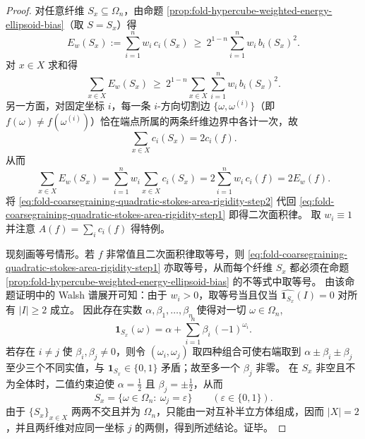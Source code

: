 \begin{proof}
对任意纤维 \(S_x\subseteq\Omega_n\)，由命题 \ref{prop:fold-hypercube-weighted-energy-ellipsoid-bias}（取 \(S=S_x\)）得
\[
E_w(S_x):=\sum_{i=1}^n w_i\,c_i(S_x)\ \ge\ 2^{1-n}\sum_{i=1}^n w_i\,b_i(S_x)^2.
\]
对 \(x\in X\) 求和得
\begin{equation}\label{eq:fold-coarsegraining-quadratic-stokes-area-rigidity-step1}
\sum_{x\in X}E_w(S_x)\ \ge\ 2^{1-n}\sum_{x\in X}\sum_{i=1}^n w_i\,b_i(S_x)^2.
\end{equation}
另一方面，对固定坐标 \(i\)，每一条 \(i\)-方向切割边 \(\{\omega,\omega^{(i)}\}\)（即 \(f(\omega)\neq f(\omega^{(i)})\)）恰在端点所属的两条纤维边界中各计一次，故
\[
\sum_{x\in X}c_i(S_x)=2c_i(f).
\]
从而
\begin{equation}\label{eq:fold-coarsegraining-quadratic-stokes-area-rigidity-step2}
\sum_{x\in X}E_w(S_x)
=\sum_{i=1}^n w_i\sum_{x\in X}c_i(S_x)
=2\sum_{i=1}^n w_i\,c_i(f)
=2E_w(f).
\end{equation}
将 \eqref{eq:fold-coarsegraining-quadratic-stokes-area-rigidity-step2} 代回 \eqref{eq:fold-coarsegraining-quadratic-stokes-area-rigidity-step1} 即得二次面积律。
取 \(w_i\equiv 1\) 并注意 \(A(f)=\sum_i c_i(f)\) 得特例。
\par
现刻画等号情形。若 \(f\) 非常值且二次面积律取等号，则 \eqref{eq:fold-coarsegraining-quadratic-stokes-area-rigidity-step1} 亦取等号，从而每个纤维 \(S_x\) 都必须在命题 \ref{prop:fold-hypercube-weighted-energy-ellipsoid-bias} 的不等式中取等号。
由该命题证明中的 Walsh 谱展开可知：由于 \(w_i>0\)，取等号当且仅当 \(\widehat{\mathbf 1_{S_x}}(I)=0\) 对所有 \(|I|\ge 2\) 成立。
因此存在实数 \(\alpha,\beta_1,\dots,\beta_n\) 使得对一切 \(\omega\in\Omega_n\),
\[
\mathbf 1_{S_x}(\omega)=\alpha+\sum_{i=1}^n \beta_i\,(-1)^{\omega_i}.
\]
若存在 \(i\neq j\) 使 \(\beta_i,\beta_j\neq 0\)，则令 \((\omega_i,\omega_j)\) 取四种组合可使右端取到 \(\alpha\pm\beta_i\pm\beta_j\) 至少三个不同实值，与 \(\mathbf 1_{S_x}\in\{0,1\}\) 矛盾；故至多一个 \(\beta_j\) 非零。
在 \(S_x\) 非空且不为全体时，二值约束迫使 \(\alpha=\tfrac12\) 且 \(\beta_j=\pm\tfrac12\)，从而
\[
S_x=\{\omega\in\Omega_n:\ \omega_j=\varepsilon\}\qquad(\varepsilon\in\{0,1\}).
\]
由于 \(\{S_x\}_{x\in X}\) 两两不交且并为 \(\Omega_n\)，只能由一对互补半立方体组成，因而 \(|X|=2\)，并且两纤维对应同一坐标 \(j\) 的两侧，得到所述结论。证毕。
\end{proof}

